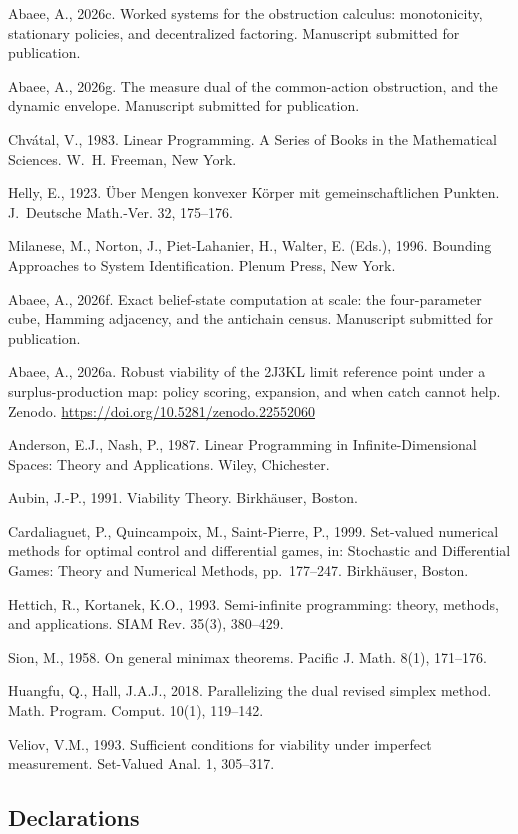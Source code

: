 \documentclass[10pt,twocolumn]{article}
\theoremstyle{plain}
\theoremstyle{definition}
\theoremstyle{remark}
\begin{document}
Abaee, A., 2026c. Worked systems for the obstruction calculus:
monotonicity, stationary policies, and decentralized factoring. Manuscript
submitted for publication.

Abaee, A., 2026g. The measure dual of the common-action obstruction, and
the dynamic envelope. Manuscript submitted for publication.

Chv\'{a}tal, V., 1983. Linear Programming. A Series of Books in the
Mathematical Sciences. W.~H. Freeman, New York.

Helly, E., 1923. \"Uber Mengen konvexer K\"orper mit gemeinschaftlichen
Punkten. J.~Deutsche Math.-Ver. 32, 175--176.

Milanese, M., Norton, J., Piet-Lahanier, H., Walter, E. (Eds.), 1996.
Bounding Approaches to System Identification. Plenum Press, New York.

Abaee, A., 2026f. Exact belief-state computation at scale: the
four-parameter cube, Hamming adjacency, and the antichain census.
Manuscript submitted for publication.

Abaee, A., 2026a. Robust viability of the 2J3KL limit reference point
under a surplus-production map: policy scoring, expansion, and when catch
cannot help. Zenodo. \url{https://doi.org/10.5281/zenodo.22552060}

Anderson, E.J., Nash, P., 1987. Linear Programming in Infinite-Dimensional
Spaces: Theory and Applications. Wiley, Chichester.

Aubin, J.-P., 1991. Viability Theory. Birkh\"auser, Boston.

Cardaliaguet, P., Quincampoix, M., Saint-Pierre, P., 1999. Set-valued
numerical methods for optimal control and differential games, in:
Stochastic and Differential Games: Theory and Numerical Methods,
pp.~177--247. Birkh\"auser, Boston.

Hettich, R., Kortanek, K.O., 1993. Semi-infinite programming: theory,
methods, and applications. SIAM Rev. 35(3), 380--429.

Sion, M., 1958. On general minimax theorems. Pacific J. Math. 8(1),
171--176.

Huangfu, Q., Hall, J.A.J., 2018. Parallelizing the dual revised simplex
method. Math. Program. Comput. 10(1), 119--142.

Veliov, V.M., 1993. Sufficient conditions for viability under imperfect
measurement. Set-Valued Anal. 1, 305--317.

\subsection*{Declarations}
\end{document}

